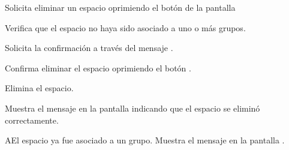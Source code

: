 \begin{UCtrayectoria}
	\UCpaso [\UCactor] Solicita eliminar un espacio oprimiendo el botón 
	de la pantalla 
	
	\UCpaso [\UCsist] Verifica que el espacio no haya sido asociado a uno o más grupos. 
	
	\UCpaso [\UCsist] Solicita la confirmación a través del mensaje .
	
	\UCpaso [\UCactor] Confirma eliminar el espacio oprimiendo el botón .
	
	\UCpaso [\UCsist] Elimina el espacio.
	
	\UCpaso [\UCsist] Muestra el mensaje  en la pantalla  indicando que el espacio se eliminó correctamente.	
	
\end{UCtrayectoria}

\begin{UCtrayectoriaA}{A}{El espacio ya fue asociado a un grupo.}
	\UCpaso [\UCsist] Muestra el mensaje  en la pantalla . 
	
\end{UCtrayectoriaA}

